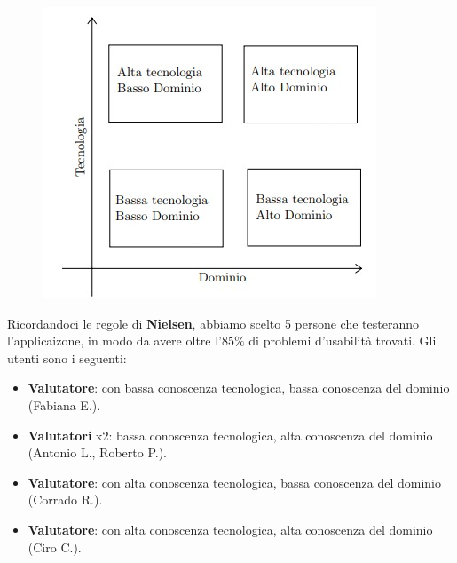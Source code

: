 \begin{figure}[H]
  \centering
  \includegraphics[scale=0.7]{img/varie/valutatori.jpeg}
\end{figure}
Ricordandoci le regole di \textbf{Nielsen}, abbiamo scelto 5 persone che testeranno l'applicaizone, in modo da avere oltre l'$85\%$ di problemi d'usabilità trovati. Gli utenti sono i seguenti:
\begin{itemize}
  \item \textbf{Valutatore}: con bassa conoscenza tecnologica, bassa conoscenza del dominio (Fabiana E.).
  \item \textbf{Valutatori} x2: bassa conoscenza tecnologica, alta conoscenza del dominio
        \subitem (Antonio L., Roberto P.).
  \item \textbf{Valutatore}: con alta conoscenza tecnologica, bassa conoscenza del dominio (Corrado R.).
  \item \textbf{Valutatore}: con alta conoscenza tecnologica, alta conoscenza del dominio (Ciro C.).
\end{itemize}
\newpage
